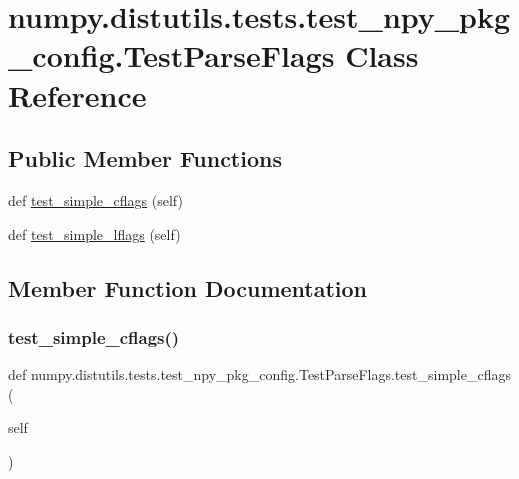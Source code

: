 \hypertarget{classnumpy_1_1distutils_1_1tests_1_1test__npy__pkg__config_1_1TestParseFlags}{}\section{numpy.\+distutils.\+tests.\+test\+\_\+npy\+\_\+pkg\+\_\+config.\+Test\+Parse\+Flags Class Reference}
\label{classnumpy_1_1distutils_1_1tests_1_1test__npy__pkg__config_1_1TestParseFlags}
\subsection*{Public Member Functions}
\begin{DoxyCompactItemize}
\item 
def \hyperlink{classnumpy_1_1distutils_1_1tests_1_1test__npy__pkg__config_1_1TestParseFlags_a22aaeaf07c7886c7881e633979a597f7}{test\+\_\+simple\+\_\+cflags} (self)
\item 
def \hyperlink{classnumpy_1_1distutils_1_1tests_1_1test__npy__pkg__config_1_1TestParseFlags_ac49b389dedec2439b7a33629ee007bd6}{test\+\_\+simple\+\_\+lflags} (self)
\end{DoxyCompactItemize}


\subsection{Member Function Documentation}
\mbox{\label{classnumpy_1_1distutils_1_1tests_1_1test__npy__pkg__config_1_1TestParseFlags_a22aaeaf07c7886c7881e633979a597f7}} 
\subsubsection{\texorpdfstring{test\+\_\+simple\+\_\+cflags()}{test\_simple\_cflags()}}
{\footnotesize\ttfamily def numpy.\+distutils.\+tests.\+test\+\_\+npy\+\_\+pkg\+\_\+config.\+Test\+Parse\+Flags.\+test\+\_\+simple\+\_\+cflags (\begin{DoxyParamCaption}\item[{}]{self }\end{DoxyParamCaption})}

